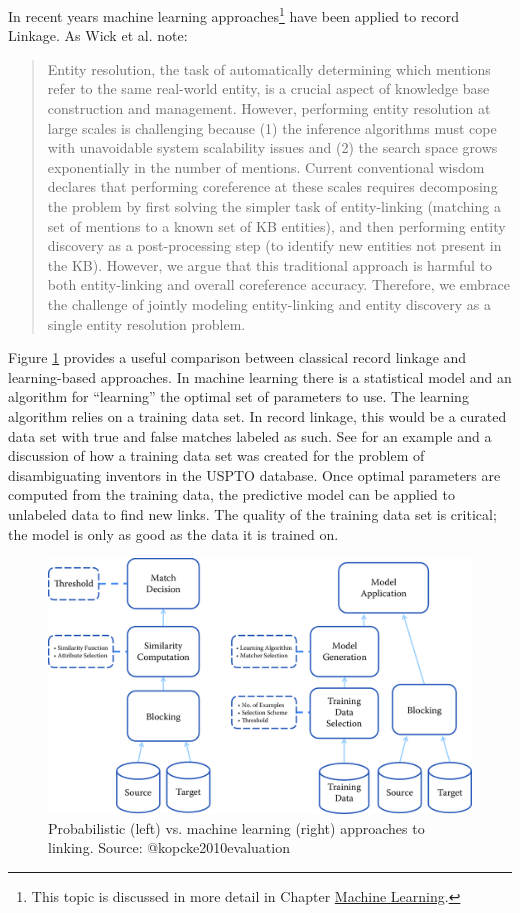 \documentclass[]{krantz}
\begin{document}
In recent years machine learning approaches\footnote{This topic is
  discussed in more detail in Chapter
  \protect\hyperlink{chap:ml}{Machine Learning}.} have been applied to
record Linkage. As Wick et al. \citeyearpar{wick2013joint} note:

\begin{quote}
Entity resolution, the task of automatically determining which mentions
refer to the same real-world entity, is a crucial aspect of knowledge
base construction and management. However, performing entity resolution
at large scales is challenging because (1) the inference algorithms must
cope with unavoidable system scalability issues and (2) the search space
grows exponentially in the number of mentions. Current conventional
wisdom declares that performing coreference at these scales requires
decomposing the problem by first solving the simpler task of
entity-linking (matching a set of mentions to a known set of KB
entities), and then performing entity discovery as a post-processing
step (to identify new entities not present in the KB). However, we argue
that this traditional approach is harmful to both entity-linking and
overall coreference accuracy. Therefore, we embrace the challenge of
jointly modeling entity-linking and entity discovery as a single entity
resolution problem.
\end{quote}

Figure \ref{fig:fig3-2} provides a useful comparison between classical
record linkage and learning-based approaches. In machine learning there
is a statistical model and an algorithm for ``learning'' the optimal set
of parameters to use. The learning algorithm relies on a training data
set. In record linkage, this would be a curated data set with true and
false matches labeled as such. See \citep{ventura2015seeing} for an
example and a discussion of how a training data set was created for the
problem of disambiguating inventors in the USPTO database. Once optimal
parameters are computed from the training data, the predictive model can
be applied to unlabeled data to find new links. The quality of the
training data set is critical; the model is only as good as the data it
is trained on.

\begin{figure}

{\centering \includegraphics[width=0.7\linewidth]{ChapterLinkage/figures/fig3-2} 

}

\caption{Probabilistic (left) vs. machine learning (right) approaches to linking. Source: @kopcke2010evaluation}\label{fig:fig3-2}
\end{figure}
\end{document}
